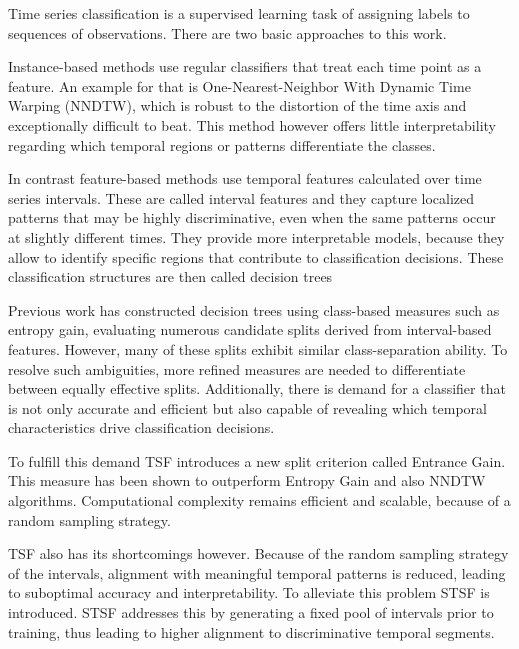 \par Time series classification is a supervised learning task of 
assigning labels to sequences of observations. There are two 
basic approaches to this work. 

Instance-based methods use regular classifiers that treat each time point
as a feature. An example for that is One-Nearest-Neighbor With Dynamic Time Warping 
(NNDTW), which is robust to the distortion of the time axis and exceptionally difficult to beat. %
This method however offers little interpretability 
regarding which temporal regions or patterns differentiate the classes.

In contrast feature-based methods use temporal features calculated over time series intervals. %
These are called interval features and they capture localized patterns that may be highly 
discriminative, even when the same patterns occur at slightly different times. They provide 
more interpretable models, because they allow to identify specific regions that contribute to classification decisions.
These classification structures are then called decision trees

Previous work has constructed decision trees using class-based measures such as entropy gain, evaluating
numerous candidate splits derived from interval-based features. However, many of these splits exhibit 
similar class-separation ability. To resolve such ambiguities, more refined measures are needed to 
differentiate between equally effective splits. Additionally, there is demand for a classifier 
that is not only accurate and efficient but also capable of revealing which temporal characteristics 
drive classification decisions.

To fulfill this demand TSF introduces a new split criterion called Entrance Gain. 
This measure has been shown to outperform Entropy Gain and also NNDTW algorithms. 
Computational complexity remains efficient and scalable, because of a random sampling
strategy.

TSF also has its shortcomings however. Because of the random sampling strategy of the intervals,
alignment with meaningful temporal patterns is reduced, leading to suboptimal accuracy and interpretability.
To alleviate this problem STSF is introduced. STSF addresses this by generating a fixed pool of 
intervals prior to training, thus leading to higher alignment to discriminative temporal segments.
